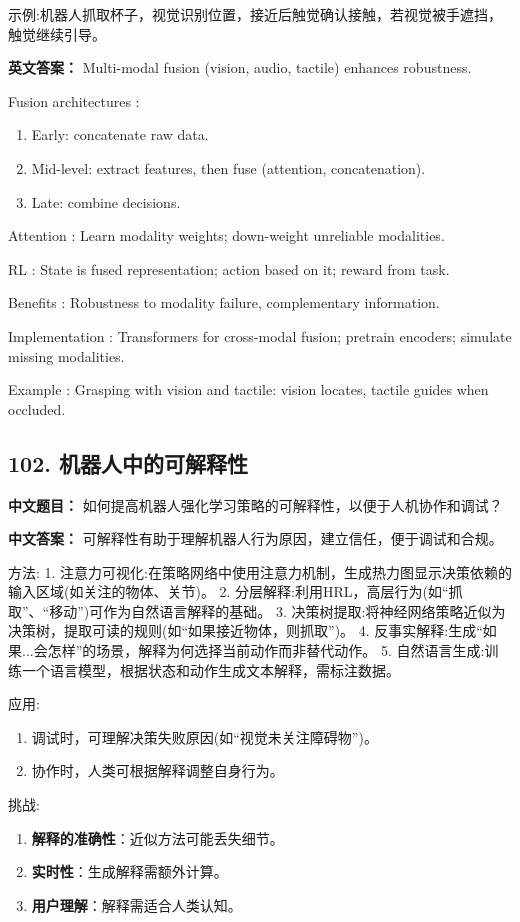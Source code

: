 \documentclass[10pt,a4paper]{ctexart}
\begin{document}
 示例:机器人抓取杯子，视觉识别位置，接近后触觉确认接触，若视觉被手遮挡，触觉继续引导。

\textbf{英文答案：}  
Multi-modal fusion (vision, audio, tactile) enhances robustness.

 Fusion architectures :
\begin{enumerate}
    \item Early: concatenate raw data.
    \item Mid-level: extract features, then fuse (attention, concatenation).
    \item Late: combine decisions.
\end{enumerate}

 Attention : Learn modality weights; down-weight unreliable modalities.

 RL : State is fused representation; action based on it; reward from task.

 Benefits : Robustness to modality failure, complementary information.

 Implementation : Transformers for cross-modal fusion; pretrain encoders; simulate missing modalities.

 Example : Grasping with vision and tactile: vision locates, tactile guides when occluded.

\subsection*{102. 机器人中的可解释性}
\textbf{中文题目：} 如何提高机器人强化学习策略的可解释性，以便于人机协作和调试？

\textbf{中文答案：}  
可解释性有助于理解机器人行为原因，建立信任，便于调试和合规。

 方法:
1.  注意力可视化:在策略网络中使用注意力机制，生成热力图显示决策依赖的输入区域(如关注的物体、关节)。
2.  分层解释:利用HRL，高层行为(如“抓取”、“移动”)可作为自然语言解释的基础。
3.  决策树提取:将神经网络策略近似为决策树，提取可读的规则(如“如果接近物体，则抓取”)。
4.  反事实解释:生成“如果...会怎样”的场景，解释为何选择当前动作而非替代动作。
5.  自然语言生成:训练一个语言模型，根据状态和动作生成文本解释，需标注数据。

 应用:
\begin{enumerate}
    \item 调试时，可理解决策失败原因(如“视觉未关注障碍物”)。
    \item 协作时，人类可根据解释调整自身行为。
\end{enumerate}

 挑战:
\begin{enumerate}
    \item \textbf{解释的准确性}：近似方法可能丢失细节。
    \item \textbf{实时性}：生成解释需额外计算。
    \item \textbf{用户理解}：解释需适合人类认知。
\end{enumerate}
\end{document}
